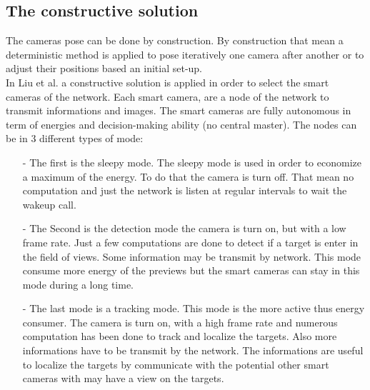 \subsection{The constructive solution}

The cameras pose can be done by construction. By construction that mean a deterministic method is applied to pose iteratively one camera after another or to adjust their positions based an initial set-up.\\
In Liu et al. \cite{38*liu2010} a constructive solution is applied in order to select the smart cameras of the network. Each smart camera, are a node of the network to transmit informations and images. The smart cameras are fully autonomous in term of energies and decision-making ability (no central master). 
The nodes can be  in 3 different types of mode:
\begin{itemize}
\item[-] The first is the sleepy mode. The sleepy mode is used in order to economize a maximum of the energy. To do that the camera is turn off. That mean no computation and just the network is listen at regular intervals to wait the wakeup call.   \\

\item[-] The Second is the detection mode the camera is turn on, but with a low frame rate. Just a few computations are done to detect if a target is enter in the field of views. Some information may be transmit by network. This mode consume more energy of the previews but the smart cameras can stay in this mode during a long time.\\

\item[-] The last mode is a tracking mode. This mode is the more active thus energy consumer. The camera is turn on, with a high frame rate and numerous computation has been done to track and localize the targets. Also more informations have to be transmit by the network. The informations are useful to localize the targets by communicate with the potential other smart cameras with may have a view on the targets. 
\end{itemize}

